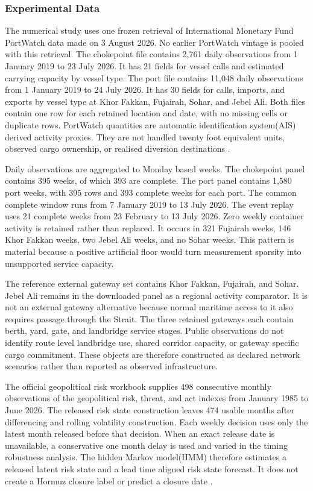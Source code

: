 \documentclass[a4paper,fleqn]{cas-sc}
\begin{document}
\subsubsection{Experimental Data}

The numerical study uses one frozen retrieval of International Monetary Fund
PortWatch data made on 3 August 2026. No earlier PortWatch vintage is pooled
with this retrieval. The chokepoint file contains 2,761 daily observations from
1 January 2019 to 23 July 2026. It has 21 fields for vessel calls and estimated
carrying capacity by vessel type. The port file contains 11,048 daily
observations from 1 January 2019 to 24 July 2026. It has 30 fields for calls,
imports, and exports by vessel type at Khor Fakkan, Fujairah, Sohar, and Jebel
Ali. Both files contain one row for each retained location and date, with no
missing cells or duplicate rows. PortWatch quantities are automatic
identification system(AIS) derived activity proxies. They are not handled
twenty foot equivalent units, observed cargo ownership, or realised diversion
destinations \citep{IMFPortWatch2023,IMFPortWatchMethod2025}.

Daily observations are aggregated to Monday based weeks. The chokepoint panel
contains 395 weeks, of which 393 are complete. The port panel contains 1,580
port weeks, with 395 rows and 393 complete weeks for each port. The common
complete window runs from 7 January 2019 to 13 July 2026. The event replay uses
21 complete weeks from 23 February to 13 July 2026. Zero weekly container
activity is retained rather than replaced. It occurs in 321 Fujairah weeks,
146 Khor Fakkan weeks, two Jebel Ali weeks, and no Sohar weeks. This pattern is
material because a positive artificial floor would turn measurement sparsity
into unsupported service capacity.

The reference external gateway set contains Khor Fakkan, Fujairah, and Sohar.
Jebel Ali remains in the downloaded panel as a regional activity comparator.
It is not an external gateway alternative because normal maritime access to it
also requires passage through the Strait. The three retained gateways each
contain berth, yard, gate, and landbridge service stages. Public observations
do not identify route level landbridge use, shared corridor capacity, or
gateway specific cargo commitment. These objects are therefore constructed as
declared network scenarios rather than reported as observed infrastructure.

The official geopolitical risk workbook supplies 498 consecutive monthly
observations of the geopolitical risk, threat, and act indexes from January
1985 to June 2026. The released risk state construction leaves 474 usable
months after differencing and rolling volatility construction.
Each weekly decision uses only the latest month released before that decision.
When an exact release date is unavailable, a conservative one month delay is
used and varied in the timing robustness analysis. The hidden Markov model(HMM)
therefore estimates a released latent risk state and a lead time aligned risk
state forecast. It does not create a Hormuz closure label or predict a closure
date \citep{CaldaraIacoviello2022}.
\end{document}
